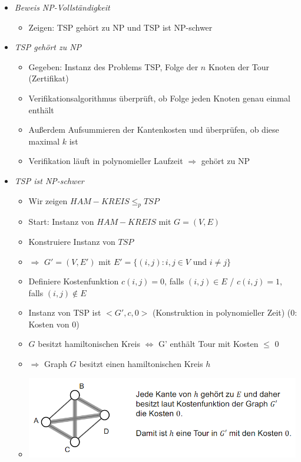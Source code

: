 \documentclass[
    12pt,
    a4paper,
    ngerman,
    color=3b,%
    marginpar=false,
    colorback=false,
    leqno,
]{tudaexercise}
\begin{document}
\begin{itemize}
\begin{itemize}
\begin{itemize}
                    \end{itemize}
              \item \textit{Beweis NP-Vollständigkeit}
                    \begin{itemize}
                        \item Zeigen: TSP gehört zu NP und TSP ist NP-schwer
                    \end{itemize}
              \item \textit{TSP gehört zu NP}
                    \begin{itemize}
                        \item Gegeben: Instanz des Problems TSP, Folge der $n$ Knoten der Tour (Zertifikat)
                        \item Verifikationsalgorithmus überprüft, ob Folge jeden Knoten genau einmal enthält
                        \item Au\ss{}erdem Aufsummieren der Kantenkosten und überprüfen, ob diese maximal $k$ ist
                        \item Verifikation läuft in polynomieller Laufzeit $\Rightarrow$ gehört zu NP
                    \end{itemize}
                    \clearpage
              \item \textit{TSP ist NP-schwer}
                    \begin{itemize}
                        \item Wir zeigen $HAM-KREIS \leq_p TSP$
                        \item Start: Instanz von $HAM-KREIS$ mit $G=(V,E)$
                        \item Konstruiere Instanz von $TSP$
                        \item[] $\Rightarrow$ $G'=(V,E')$ mit $E'=\{(i,j):i,j \in V$ und $i\neq j\}$
                        \item Definiere Kostenfunktion $c(i,j) = 0$, falls $(i,j) \in E$ / $c(i,j)=1$, falls $(i,j) \notin E$
                        \item Instanz von TSP ist $<G', c, 0>$ (Konstruktion in polynomieller Zeit) (0: Kosten von 0)
                        \item {} $G$ besitzt hamiltonischen Kreis $\Leftrightarrow$ G' enthält Tour mit Kosten $\leq$ 0
                        \item $\Rightarrow$ Graph $G$ besitzt einen hamiltonischen Kreis $h$
                        \item[] \includegraphics[width=12cm]{pictures/schwer1.PNG}

\end{itemize}
\end{itemize}
\end{itemize}
\end{document}
